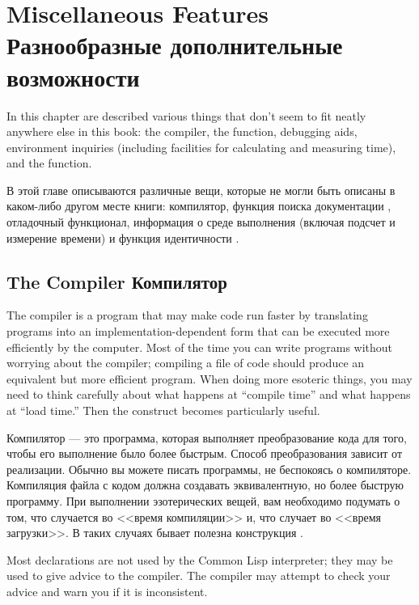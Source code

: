 
\clearpage\def\pagestatus{FINAL PROOF}

\chapter{Miscellaneous Features Разнообразные дополнительные возможности}

In this chapter are described various things that don't
seem to fit neatly anywhere else in this book:
the compiler, the 
function, debugging aids, environment inquiries (including facilities
for calculating and measuring time), and the  function.

В этой главе описываются различные вещи, которые не могли быть описаны в
каком-либо другом месте книги:
компилятор, функция поиска документации , отладочный
функционал, информация о среде выполнения (включая подсчет и измерение времени)
и функция идентичности . 

\section{The Compiler Компилятор}
\label{COMPILER-SECTION} 

The compiler is a program that may make code run faster by translating
programs into an implementation-dependent form that can
be executed more efficiently by the computer.  Most of the time
you can write programs without worrying about the compiler;
compiling a file of code should produce an equivalent but more
efficient program.  When doing more esoteric things, you may need to
think carefully about what happens at ``compile time'' and what happens
at ``load time.''  Then the  construct
becomes particularly useful.

Компилятор --- это программа, которая выполняет преобразование кода для того,
чтобы его выполнение было более быстрым. Способ преобразования зависит от
реализации. Обычно вы можете писать программы, не беспокоясь о
компиляторе. Компиляция файла с кодом должна создавать эквивалентную, но более
быструю программу. При выполнении эзотерических вещей, вам необходимо подумать о
том, что случается во <<время компиляции>> и, что случает во <<время
загрузки>>. В таких случаях бывает полезна конструкция .

Most declarations are not used by the Common Lisp interpreter;
they may be used to give advice to the compiler.  The compiler may attempt
to check your advice and warn you if it is inconsistent.

